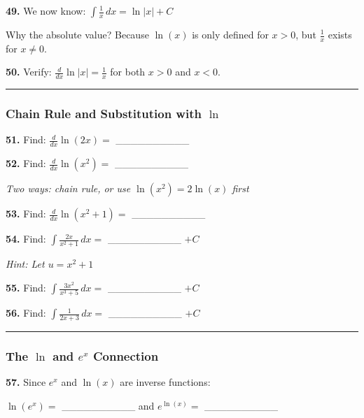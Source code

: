 \documentclass[
  11pt,
]{article}
\begin{document}
\textbf{49.} We now know: \(\int \frac{1}{x} \, dx = \ln|x| + C\)

Why the absolute value? Because \(\ln(x)\) is only defined for
\(x > 0\), but \(\frac{1}{x}\) exists for \(x \neq 0\).

\textbf{50.} Verify: \(\frac{d}{dx}\ln|x| = \frac{1}{x}\) for both
\(x > 0\) and \(x < 0\).

\begin{center}\rule{0.5\linewidth}{0.5pt}\end{center}

\hypertarget{chain-rule-and-substitution-with-ln}{%
\subsubsection{\texorpdfstring{Chain Rule and Substitution with
\(\ln\)}{Chain Rule and Substitution with \textbackslash ln}}\label{chain-rule-and-substitution-with-ln}}

\textbf{51.} Find: \(\frac{d}{dx}\ln(2x) ={}\) \_\_\_\_\_\_\_\_\_\_

\textbf{52.} Find: \(\frac{d}{dx}\ln(x^2) ={}\) \_\_\_\_\_\_\_\_\_\_

\emph{Two ways: chain rule, or use \(\ln(x^2) = 2\ln(x)\) first}

\textbf{53.} Find: \(\frac{d}{dx}\ln(x^2 + 1) ={}\) \_\_\_\_\_\_\_\_\_\_

\textbf{54.} Find: \(\int \frac{2x}{x^2 + 1} \, dx ={}\)
\_\_\_\_\_\_\_\_\_\_ \(+ C\)

\emph{Hint: Let \(u = x^2 + 1\)}

\textbf{55.} Find: \(\int \frac{3x^2}{x^3 + 5} \, dx ={}\)
\_\_\_\_\_\_\_\_\_\_ \(+ C\)

\textbf{56.} Find: \(\int \frac{1}{2x + 3} \, dx ={}\)
\_\_\_\_\_\_\_\_\_\_ \(+ C\)

\begin{center}\rule{0.5\linewidth}{0.5pt}\end{center}

\hypertarget{the-ln-and-ex-connection}{%
\subsubsection{\texorpdfstring{The \(\ln\) and \(e^x\)
Connection}{The \textbackslash ln and e\^{}x Connection}}\label{the-ln-and-ex-connection}}

\textbf{57.} Since \(e^x\) and \(\ln(x)\) are inverse functions:

\(\ln(e^x) ={}\) \_\_\_\_\_\_\_\_\_\_ and \(e^{\ln(x)} ={}\)
\_\_\_\_\_\_\_\_\_\_
\end{document}
